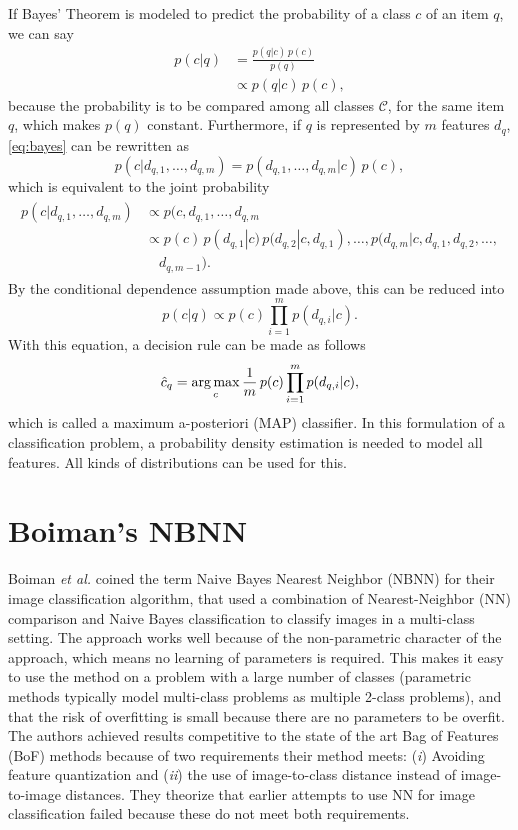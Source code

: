 If Bayes' Theorem is modeled to predict the probability of a class $c$ of an item $q$, we can say
\begin{align}
    \label{eq:bayes}
    p(c|q)      &= \frac{p(q|c)\,p(c)}{p(q)}\\
                &\propto p(q|c)\,p(c),
\end{align}
because the probability is to be compared among all classes $\mathcal{C}$, for the same item $q$, which makes $p(q)$ constant. Furthermore, if $q$ is represented by $m$ features $d_q$, \eqref{eq:bayes} can be rewritten as
\begin{equation}
    p(c|d_{q,1},\dotsc,d_{q,m}) = p(d_{q,1}, \dotsc,d_{q,m}|c)\,p(c),
\end{equation}
which is equivalent to the joint probability
\begin{align}\begin{split}
    p(c|d_{q,1},\dotsc,d_{q,m}) &\propto p(c,d_{q,1}, \dotsc,d_{q,m}\\
        &\propto p(c)\,p(d_{q,1}|c)\, p(d_{q,2}|c,d_{q,1}), \dotsc,p(d_{q,m}|c,d_{q,1},d_{q,2},\dotsc,\\&\quad d_{q,m-1}).
    \end{split} 
\end{align}
By the conditional dependence assumption made above, this can be reduced into
\begin{equation}
    p(c|q) \propto p(c)\prod_{i=1}^m p(d_{q,i}|c).
\end{equation}
With this equation, a decision rule can be made as follows
\begin{equation} \label{eq:map}
    \hat c_q = \operatorname*{arg\,max}_c \frac{1}{m}\,p(c)\prod_{i=1}^m p(d_{q,i}|c),
\end{equation}
which is called a maximum a-posteriori (MAP) classifier. In this formulation of a classification problem, a probability density estimation is needed to model all features. All kinds of distributions can be used for this.

\section{Boiman's NBNN} %
\label{sub:boiman_s_nbnn}
Boiman \emph{et al.} \cite{boiman2008defense} coined the term Naive Bayes Nearest Neighbor (NBNN) for their image classification algorithm, that used a combination of Nearest-Neighbor (NN) comparison and Naive Bayes classification to classify images in a multi-class setting. The approach works well because of the non-parametric character of the approach, which means no learning of parameters is required. This makes it easy to use the method on a problem with a large number of classes (parametric methods typically model multi-class problems as multiple 2-class problems), and that the risk of overfitting is small because there are no parameters to be overfit. The authors achieved results competitive to the state of the art Bag of Features (BoF) methods because of two requirements their method meets: (\emph{i}) Avoiding feature quantization and (\emph{ii}) the use of image-to-class distance instead of image-to-image distances. They theorize that earlier attempts to use NN  for image classification failed because these do not meet both requirements.

